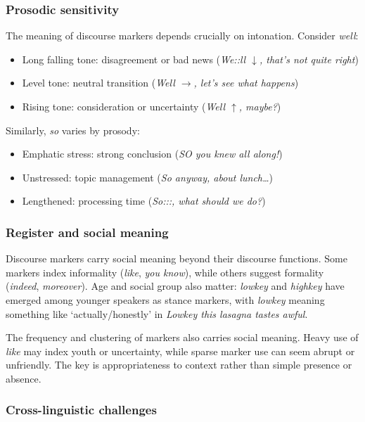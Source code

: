 \subsubsection*{Prosodic sensitivity}

The meaning of discourse markers depends crucially on intonation. Consider \textit{well}:

\begin{itemize}[noitemsep]
   \item Long falling tone: disagreement or bad news (\textit{We::ll $\downarrow$, that's not quite right})
   \item Level tone: neutral transition (\textit{Well $\rightarrow$, let's see what happens})
   \item Rising tone: consideration or uncertainty (\textit{Well $\uparrow$, maybe?})
\end{itemize}

Similarly, \textit{so} varies by prosody:
\begin{itemize}[noitemsep]
   \item Emphatic stress: strong conclusion (\textit{SO you knew all along!})
   \item Unstressed: topic management (\textit{So anyway, about lunch\dots})
   \item Lengthened: processing time (\textit{So:::, what should we do?})
\end{itemize}

\subsubsection*{Register and social meaning}

Discourse markers carry social meaning beyond their discourse functions. Some markers index informality (\textit{like}, \textit{you know}), while others suggest formality (\textit{indeed}, \textit{moreover}). Age and social group also matter: \textit{lowkey} and \textit{highkey} have emerged among younger speakers as stance markers, with \textit{lowkey} meaning something like `actually/honestly' in \textit{Lowkey this lasagna tastes awful}.

The frequency and clustering of markers also carries social meaning. Heavy use of \textit{like} may index youth or uncertainty, while sparse marker use can seem abrupt or unfriendly. The key is appropriateness to context rather than simple presence or absence.

\subsubsection*{Cross-linguistic challenges}

